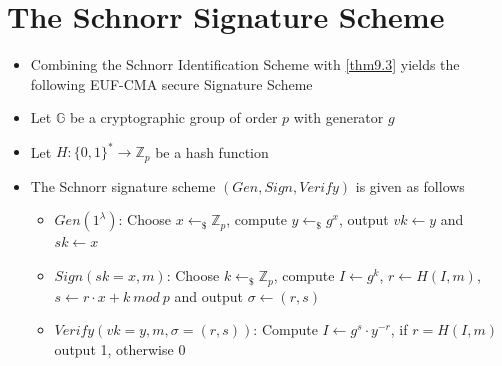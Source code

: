 \section{The Schnorr Signature Scheme}
    \begin{itemize}
        \item Combining the Schnorr Identification Scheme with \cref{thm9.3} yields the following EUF-CMA secure Signature Scheme
        \item Let $\mathbb{G}$ be a cryptographic group of order $p$ with generator $g$
        \item Let $H: \{0,1\}^* \rightarrow \mathbb{Z}_p$ be a hash function
        \item The Schnorr signature scheme $(Gen,Sign,Verify)$ is given as follows
        \begin{itemize}
            \item $Gen(1^{\lambda})$: Choose $x \leftarrow_{\$} \mathbb{Z}_p$, compute $y \leftarrow_{\$} g^x$, output $vk \leftarrow y$ and $sk \leftarrow x$
            \item $Sign(sk=x,m)$: Choose $k \leftarrow_{\$} \mathbb{Z}_p$, compute $I \leftarrow g^k$, $r \leftarrow H(I,m)$, $s \leftarrow r \cdot x + k\ mod\ p$
            and output $\sigma \leftarrow (r,s)$
            \item $Verify(vk=y,m,\sigma = (r,s))$: Compute $I \leftarrow g^s \cdot y^{-r}$, if $r=H(I,m)$ output 1, otherwise 0
        \end{itemize}
    \end{itemize}


